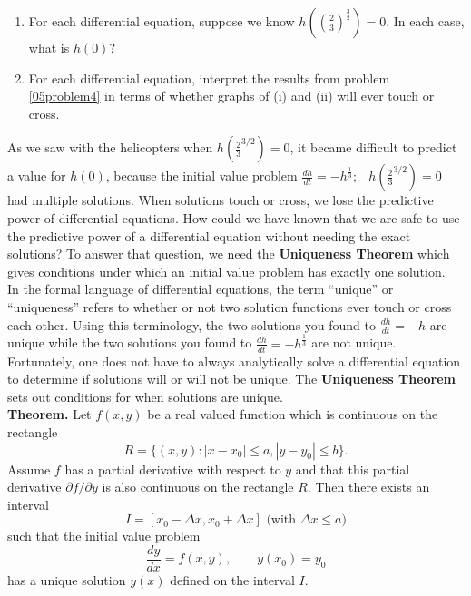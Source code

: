 \begin{enumerate}
\begin{enumerate}
\item For each differential equation, suppose we know $h\left(\left(\frac{2}{3}\right)^{\frac{3}{2}}\right)=0$. In each case, what is $h(0)$? \label{05problem5partb}
\vfill

\item For each differential equation, interpret the results from problem \ref{05problem4} in terms of whether graphs of (i) and (ii) will ever touch or cross. \label{05problem5partc}
\vfill
\end{enumerate}
\end{enumerate}

\newpage


As we saw with the helicopters when $h\left(\frac{2}{3}^{3/2}\right)=0$, it became difficult to predict a value for $h(0)$, because the initial value problem $\displaystyle\frac{dh}{dt}=-h^{\frac{1}{3}};~~$ $h\left(\frac{2}{3}^{3/2}\right)=0$ had multiple solutions. When solutions touch or cross, we lose the predictive power of differential equations. How could we have known that we are safe to use the predictive power of a differential equation without needing the exact solutions? To answer that question, we need the \textbf{Uniqueness Theorem} which gives conditions under which an initial value problem has exactly one solution. \\

In the formal language of differential equations, the term ``unique'' or ``uniqueness'' refers to whether or not two solution functions ever touch or cross each other. Using this terminology, the two solutions you found to $\displaystyle\frac{dh}{dt}=-h$ are unique while the two solutions you found to $\displaystyle\frac{dh}{dt}=-h^{\frac{1}{3}}$ are not unique. Fortunately, one does not have to always analytically solve a differential equation to determine if solutions will or will not be unique. The \textbf{Uniqueness Theorem} sets out conditions for when solutions are unique. \\

\textbf{Theorem.} Let $f(x,y)$ be a real valued function which is continuous on the rectangle 
\[R=\{(x,y):|x-x_0 |\leq a,|y-y_0 |\leq b\}.\]
Assume $f$ has a partial derivative with respect to $y$ and that this partial derivative $\partial f/\partial y$ is also continuous on the rectangle $R$. Then there exists an interval 
\[I = [x_0 - \Delta x, x_0 + \Delta x] \text{ (with $\Delta x \leq a$)}\]
such that the initial value problem 
\[ \frac{dy}{dx}=f(x,y), \qquad y(x_0)=y_0\]
has a unique solution $y(x)$ defined on the interval $I$.

